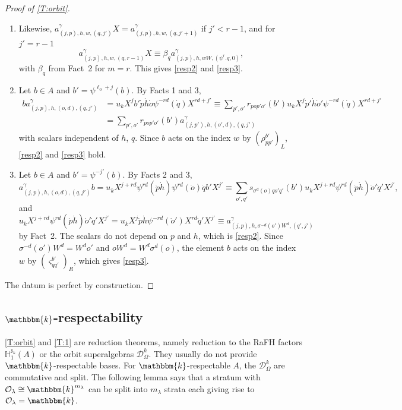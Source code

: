 \documentclass[a4paper,11pt]{amsart}
\numberwithin{equation}{subsection}
\theoremstyle{definition}
\theoremstyle{theorem}
\theoremstyle{remark}
\newcommand\CO{\mathcal{O}}
\newcommand\kapp{{\mathfrak{z}}}
\newcommand\Olam[1][\lambda]{\CO_{#1}}
\newcommand\HH{\mathbb{H}}
\newcommand\kk{\mathbbm{k}}
\begin{document}
\begin{proof}[Proof of \autoref{T:orbit}]
\begin{enumerate}[label=(\roman*),wide,labelindent=0pt]
  \item Likewise, $a^{\gamma}_{(j,p),h,w,(q,j')}X=a^{\gamma}_{(j,p),h,w,(q,j'+1)}$ if $j'<r-1$,
  and for $j'=r-1$
  \[
    a^{\gamma}_{(j,p),h,w,(q,r-1)}X\equiv\beta_qa^{\gamma}_{(j,p),h,wW,(\psi^{r}.q,0)},
  \]
  with $\beta_q$ from Fact~2 for $m=r$. This gives \autoref{resp2} and \autoref{resp3}.
\item Let $b\in A$ and $b'=\psi^{\ell_0+j}(b)$. By Facts 1 and 3,
  \begin{align*}
    ba^{\gamma}_{(j,p),h,(o,d),(q,j')}
    &=u_kX^{j}b'\dot p\dot h\dot o\psi^{-rd}(\dot q)X^{rd+j'}
    \equiv\sum_{p',o'}r_{pop'o'}(b')u_kX^{j}\dot p'\dot h\dot o'\psi^{-rd}(\dot q)X^{rd+j'}\\
    &=\sum_{p',o'}r_{pop'o'}(b')a^{\gamma}_{(j,p'),h,(o',d),(q,j')}
  \end{align*}
  with scalars independent of $h$, $q$. Since $b$ acts on the
  index $w$ by $(\rho^{b'}_{pp'})_L$, \autoref{resp2} and \autoref{resp3} hold.
\item Let $b\in A$ and $b'=\psi^{-j'}(b)$. By Facts 2 and 3,
  \[
    a^{\gamma}_{(j,p),h,(o,d),(q,j')}b
    =u_kX^{j+rd}\psi^{rd}(\dot p\dot h)\psi^{rd}(\dot o)\dot qb'X^{j'}
    \equiv\sum_{o',q'}s_{\sigma^{d}(o)qo'q'}(b')u_kX^{j+rd}\psi^{rd}(\dot p\dot h)\dot o'\dot q'X^{j'},
  \]
  and $u_kX^{j+rd}\psi^{rd}(\dot p\dot h)\dot o'\dot q'X^{j'}
  =u_kX^{j}\dot p\dot h\psi^{-rd}(\dot o')X^{rd}\dot q'X^{j'}
  \equiv a^{\gamma}_{(j,p),h,\sigma^{-d}(o')W^{d},(q',j')}$ by Fact~2. The scalars do not
  depend on $p$ and $h$, which is \autoref{resp2}. Since $\sigma^{-d}(o')W^{d}=W^{d}o'$ and
  $oW^{d}=W^{d}\sigma^{d}(o)$, the element $b$ acts on the index $w$ by
  $(\varsigma^{b'}_{qq'})_R$, which gives \autoref{resp3}.
\end{enumerate}
The datum is perfect by construction.
\end{proof}



\subsection{$\kk$-respectability}
\autoref{T:orbit} and \autoref{T:1} are reduction theorems, namely reduction to the RaFH factors $\HH^{\kapp_k}_1(A)$ or the orbit superalgebras
$\mathcal{D}^{k}_\Omega$. They  usually do not provide $\kk$-respectable bases. For $\kk$-respectable $A$, the $\mathcal{D}^{k}_\Omega$ are commutative and split. The following lemma says that a stratum with $\Olam\cong\kk^{m_\lambda}$ can be split into $m_\lambda$ strata each giving rise to  $\Olam=\kk$.
\end{document}
